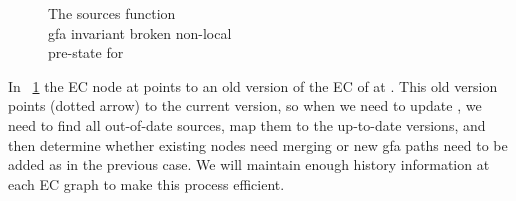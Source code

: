 \begin{figure}[H]

\caption{
The sources function\\
gfa invariant broken non-local\\
pre-state for 
}
\label{snippet3.16a_graph8}
\end{figure}
In ~\ref{snippet3.16a_graph8} the EC node  at  points to an old version of the EC of  at .
This old version points (dotted arrow) to the current version, so when we need to update , we need to find all out-of-date sources, map them to the up-to-date versions, and then determine whether existing nodes need merging or new gfa paths need to be added as in the previous case. We will maintain enough history information at each EC graph to make this process efficient.

